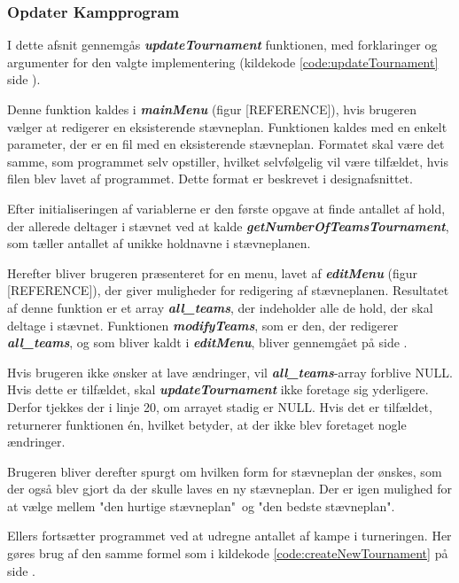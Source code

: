 \subsubsection{Opdater Kampprogram}
I dette afsnit gennemgås \textbf{\textit{updateTournament}} funktionen, med forklaringer og argumenter for den valgte implementering (kildekode \ref{code:updateTournament} side \pageref{code:updateTournament}).
\par
Denne funktion kaldes i \textbf{\textit{mainMenu}} (figur [REFERENCE]), hvis brugeren vælger at redigerer en eksisterende stævneplan. Funktionen kaldes med en enkelt parameter, der er en fil med en eksisterende stævneplan. Formatet skal være det samme, som programmet selv opstiller, hvilket selvfølgelig vil være tilfældet, hvis filen blev lavet af programmet. Dette format er beskrevet i designafsnittet.
\par
Efter initialiseringen af variablerne er den første opgave at finde antallet af hold, der allerede deltager i stævnet ved at kalde \textbf{\textit{getNumberOfTeamsTournament}}, som tæller antallet af unikke holdnavne i stævneplanen. 
\par
Herefter bliver brugeren præsenteret for en menu, lavet af \textbf{\textit{editMenu}} (figur [REFERENCE]), der giver muligheder for redigering af stævneplanen. Resultatet af denne funktion er et array \textbf{\textit{all\_teams}}, der indeholder alle de hold, der skal deltage i stævnet. Funktionen \textbf{\textit{modifyTeams}}, som er den, der redigerer \textbf{\textit{all\_teams}}, og som bliver kaldt i \textbf{\textit{editMenu}}, bliver gennemgået på side \pageref{modifyTeamsAfsnit}.
\par
Hvis brugeren ikke ønsker at lave ændringer, vil \textbf{\textit{all\_teams}}-array forblive NULL. Hvis dette er tilfældet, skal \textbf{\textit{updateTournament}} ikke foretage sig yderligere. Derfor tjekkes der i linje 20, om arrayet stadig er NULL. Hvis det er tilfældet, returnerer funktionen én, hvilket betyder, at der ikke blev foretaget nogle ændringer.
\par
Brugeren bliver derefter spurgt om hvilken form for stævneplan der ønskes, som der også blev gjort da der skulle laves en ny stævneplan. Der er igen mulighed for at vælge mellem "den hurtige stævneplan"\ og "den bedste stævneplan".
\par
Ellers fortsætter programmet ved at udregne antallet af kampe i turneringen. Her gøres brug af den samme formel som i kildekode \ref{code:createNewTournament} på side \pageref{code:createNewTournament}.
